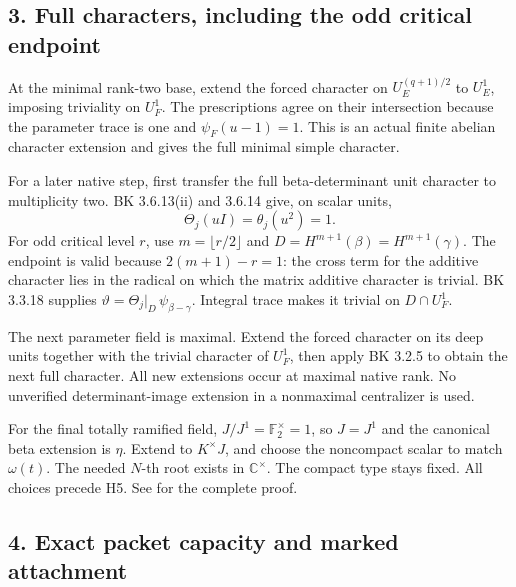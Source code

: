 \hypertarget{dyadic_synthesis-full-characters-including-the-odd-critical-endpoint}{%
\subsection{3. Full characters, including the odd critical
endpoint}\label{dyadic_synthesis-full-characters-including-the-odd-critical-endpoint}}

At the minimal rank-two base, extend the forced character on
\(U_E^{(q+1)/2}\) to \(U_E^1\), imposing triviality on \(U_F^1\). The
prescriptions agree on their intersection because the parameter trace is
one and \(\psi_F(u-1)=1\). This is an actual finite abelian character
extension and gives the full minimal simple character.

For a later native step, first transfer the full beta-determinant unit
character to multiplicity two. BK 3.6.13(ii) and 3.6.14 give, on scalar
units, \[
\Theta_j(uI)=\theta_j(u^2)=1.
\] For odd critical level \(r\), use \(m=\lfloor r/2\rfloor\) and
\(D=H^{m+1}(\beta)=H^{m+1}(\gamma)\). The endpoint is valid because
\(2(m+1)-r=1\): the cross term for the additive character lies in the radical on
which the matrix additive character is trivial. BK 3.3.18 supplies
\(\vartheta=\Theta_j|_D\,\psi_{\beta-\gamma}\). Integral trace makes it
trivial on \(D\cap U_F^1\).

The next parameter field is maximal. Extend the forced character on its
deep units together with the trivial character of \(U_F^1\), then apply
BK 3.2.5 to obtain the next full character. All new extensions occur at
maximal native rank. No unverified determinant-image extension in a
nonmaximal centralizer is used.

For the final totally ramified field, \(J/J^1=\mathbb F_2^\times=1\), so
\(J=J^1\) and the canonical beta extension is \(\eta\). Extend to
\(K^\times J\), and choose the noncompact scalar to match \(\omega(t)\).
The needed \(N\)-th root exists in \(\mathbb C^\times\). The compact
type stays fixed. All choices precede H5. See
 for the complete proof.

\hypertarget{dyadic_synthesis-exact-packet-capacity-and-marked-attachment}{%
\subsection{4. Exact packet capacity and marked
attachment}\label{dyadic_synthesis-exact-packet-capacity-and-marked-attachment}}

